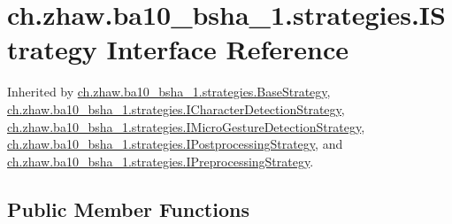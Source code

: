 \hypertarget{interfacech_1_1zhaw_1_1ba10__bsha__1_1_1strategies_1_1IStrategy}{
\section{ch.zhaw.ba10\_\-bsha\_\-1.strategies.IStrategy Interface Reference}
\label{interfacech_1_1zhaw_1_1ba10__bsha__1_1_1strategies_1_1IStrategy}
}


Inherited by \hyperlink{classch_1_1zhaw_1_1ba10__bsha__1_1_1strategies_1_1BaseStrategy}{ch.zhaw.ba10\_\-bsha\_\-1.strategies.BaseStrategy}, \hyperlink{interfacech_1_1zhaw_1_1ba10__bsha__1_1_1strategies_1_1ICharacterDetectionStrategy}{ch.zhaw.ba10\_\-bsha\_\-1.strategies.ICharacterDetectionStrategy}, \hyperlink{interfacech_1_1zhaw_1_1ba10__bsha__1_1_1strategies_1_1IMicroGestureDetectionStrategy}{ch.zhaw.ba10\_\-bsha\_\-1.strategies.IMicroGestureDetectionStrategy}, \hyperlink{interfacech_1_1zhaw_1_1ba10__bsha__1_1_1strategies_1_1IPostprocessingStrategy}{ch.zhaw.ba10\_\-bsha\_\-1.strategies.IPostprocessingStrategy}, and \hyperlink{interfacech_1_1zhaw_1_1ba10__bsha__1_1_1strategies_1_1IPreprocessingStrategy}{ch.zhaw.ba10\_\-bsha\_\-1.strategies.IPreprocessingStrategy}.\subsection*{Public Member Functions}
